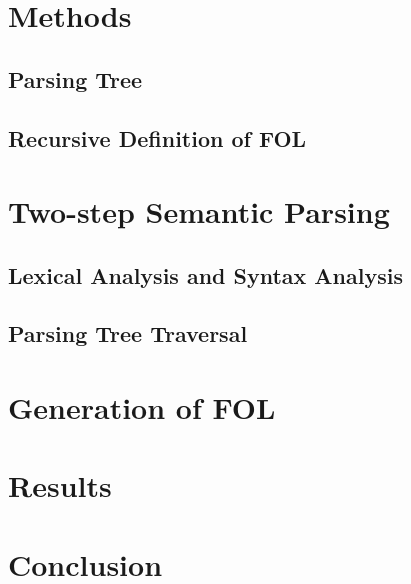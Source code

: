 \documentclass{article}
\begin{document}
\section{Methods}{
	\subsection{Parsing Tree}{
	}

	\subsection{Recursive Definition of FOL}{}
}

\section{Two-step Semantic Parsing}{
	\subsection{Lexical Analysis and Syntax Analysis}{}

	\subsection{Parsing Tree Traversal}{}
}

\section{Generation of FOL}{}

\section{Results}{}

\section{Conclusion}{}



\citation
\end{document}
